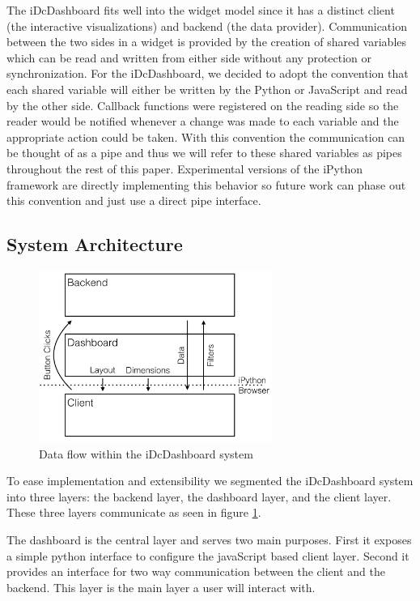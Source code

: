 \documentclass[letter,twocolumn]{article}
\begin{document}
The iDcDashboard fits well into the widget model since it has a distinct client (the interactive visualizations) and backend (the data provider).
Communication between the two sides in a widget is provided by the creation of shared variables which can be read and written from either side without any protection or synchronization.
For the iDcDashboard, we decided to adopt the convention that each shared variable will either be written by the Python or JavaScript and read by the other side.
Callback functions were registered on the reading side so the reader would be notified whenever a change was made to each variable and the appropriate action could be taken.
With this convention the communication can be thought of as a pipe and thus we will refer to these shared variables as pipes throughout the rest of this paper.
Experimental versions of the iPython framework are directly implementing this behavior so future work can phase out this convention and just use a direct pipe interface.

\subsection{System Architecture}
\begin{figure}[htb]
	\begin{center}
	\includegraphics[width=3in]{figs/dataflow.png}
	\end{center}
	\caption{Data flow within the iDcDashboard system}\label{fig:system_flow}
\end{figure}

To ease implementation and extensibility we segmented the iDcDashboard system into three layers: the backend layer, the dashboard layer, and the client layer.
These three layers communicate as seen in figure \ref{fig:system_flow}.

The dashboard is the central layer and serves two main purposes.
First it exposes a simple python interface to configure the javaScript based client layer.
Second it provides an interface for two way communication between the client and the backend.
This layer is the main layer a user will interact with.
\end{document}
